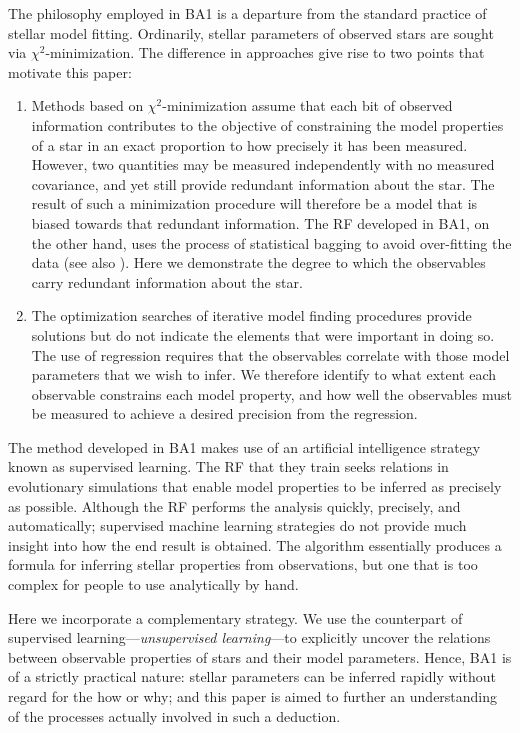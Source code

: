 The philosophy employed in BA1 is a departure from the standard practice of stellar model fitting. Ordinarily, stellar parameters of observed stars are sought via $\chi^2$-minimization.
The difference in approaches give rise to two points that motivate this paper:
\begin{enumerate}

    \item Methods based on $\chi^2$-minimization assume that each bit of observed information contributes to the objective of constraining the model properties of a star in an exact proportion to how precisely it has been measured. However, two quantities may be measured independently with no measured covariance, and yet still provide redundant information about the star. The result of such a minimization procedure will therefore be a model that is biased towards that redundant information.  The RF developed in BA1, on the other hand, uses the process of statistical bagging to avoid over-fitting the data (see also \citealt{hastie2005elements}). Here we demonstrate the degree to which the observables  carry redundant information about the star. 

    \item The %
    optimization searches of iterative model finding procedures provide solutions but do not indicate the elements that were important in doing so. The use of regression requires that the observables correlate with those model parameters that we wish to infer.  We therefore identify to what extent each observable constrains each model property, and how well the observables must be measured to achieve a desired precision from the regression.  
    
\end{enumerate}


The method developed in BA1 makes use of an artificial intelligence strategy known as supervised learning. The RF that they train seeks relations in evolutionary simulations that enable model properties to be inferred as precisely as possible. Although the RF performs the analysis quickly, precisely, and automatically; supervised machine learning strategies do not provide much insight into how the end result is obtained. The algorithm essentially produces a formula for inferring stellar properties from observations, but one that is too complex for people to use analytically by hand. 

Here we incorporate a complementary strategy. We use the counterpart of supervised learning---\emph{unsupervised learning}---to explicitly uncover the relations between observable properties of stars and their model parameters. Hence, BA1 is of a strictly practical nature: stellar parameters can be inferred rapidly without regard for the how or why; and this paper is aimed to further an understanding of the processes actually involved in such a deduction. 

